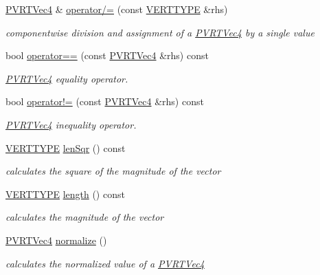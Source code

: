 \begin{DoxyCompactItemize}
\hyperlink{struct_p_v_r_t_vec4}{P\+V\+R\+T\+Vec4} \& \hyperlink{struct_p_v_r_t_vec4_a9c436afbf866e3a4ae618ac105ba6e68}{operator/=} (const \hyperlink{group___a_p_i___o_g_l_e_s_ga06da457b7d3e93368ab904f89e1396be}{V\+E\+R\+T\+T\+Y\+P\+E} \&rhs)
\begin{DoxyCompactList}\small\item\em componentwise division and assignment of a \hyperlink{struct_p_v_r_t_vec4}{P\+V\+R\+T\+Vec4} by a single value \end{DoxyCompactList}\item 
bool \hyperlink{struct_p_v_r_t_vec4_a2abd780328feb563e72a8510bd46ad18}{operator==} (const \hyperlink{struct_p_v_r_t_vec4}{P\+V\+R\+T\+Vec4} \&rhs) const 
\begin{DoxyCompactList}\small\item\em \hyperlink{struct_p_v_r_t_vec4}{P\+V\+R\+T\+Vec4} equality operator. \end{DoxyCompactList}\item 
bool \hyperlink{struct_p_v_r_t_vec4_a67e331b4a6668c9eb908048afacfc3a0}{operator!=} (const \hyperlink{struct_p_v_r_t_vec4}{P\+V\+R\+T\+Vec4} \&rhs) const 
\begin{DoxyCompactList}\small\item\em \hyperlink{struct_p_v_r_t_vec4}{P\+V\+R\+T\+Vec4} inequality operator. \end{DoxyCompactList}\item 
\hyperlink{group___a_p_i___o_g_l_e_s_ga06da457b7d3e93368ab904f89e1396be}{V\+E\+R\+T\+T\+Y\+P\+E} \hyperlink{struct_p_v_r_t_vec4_aa1ff75e0441fad638083ef0fdb17091a}{len\+Sqr} () const 
\begin{DoxyCompactList}\small\item\em calculates the square of the magnitude of the vector \end{DoxyCompactList}\item 
\hyperlink{group___a_p_i___o_g_l_e_s_ga06da457b7d3e93368ab904f89e1396be}{V\+E\+R\+T\+T\+Y\+P\+E} \hyperlink{struct_p_v_r_t_vec4_a2013d59808b69b14403cf50d5bf92e00}{length} () const 
\begin{DoxyCompactList}\small\item\em calculates the magnitude of the vector \end{DoxyCompactList}\item 
\hyperlink{struct_p_v_r_t_vec4}{P\+V\+R\+T\+Vec4} \hyperlink{struct_p_v_r_t_vec4_a06a8ba0a042a2ee52380388d4be0e51b}{normalize} ()
\begin{DoxyCompactList}\small\item\em calculates the normalized value of a \hyperlink{struct_p_v_r_t_vec4}{P\+V\+R\+T\+Vec4} \end{DoxyCompactList}\item 

\end{DoxyCompactItemize}
